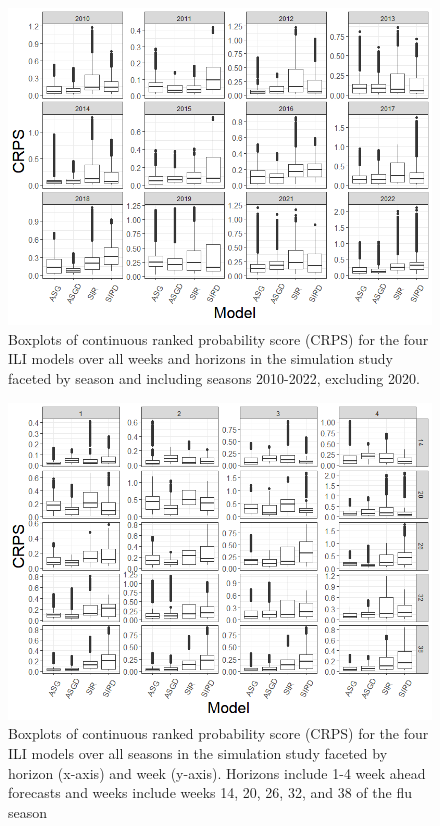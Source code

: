 \documentclass[ba]{imsart}
\theoremstyle{plain}
\theoremstyle{definition}
\theoremstyle{remark}
\begin{document}
\begin{figure}
    \centering
    \includegraphics[scale=.5]{crps_by_season.png}
    \caption{Boxplots of continuous ranked probability score (CRPS) for the four ILI models over all weeks and horizons in the simulation study faceted by season and including seasons 2010-2022, excluding 2020.}
    \label{fig:crps_by_season}
\end{figure}

\begin{figure}
    \centering
    \includegraphics[scale=.5]{crps_by_week_horizon.png}
    \caption{Boxplots of continuous ranked probability score (CRPS) for the four ILI models over all seasons in the simulation study faceted by horizon (x-axis) and week (y-axis). Horizons include 1-4 week ahead forecasts and weeks include weeks 14, 20, 26, 32, and 38 of the flu season}
    \label{fig:crps_by_week_horizon}
\end{figure}
\end{document}
